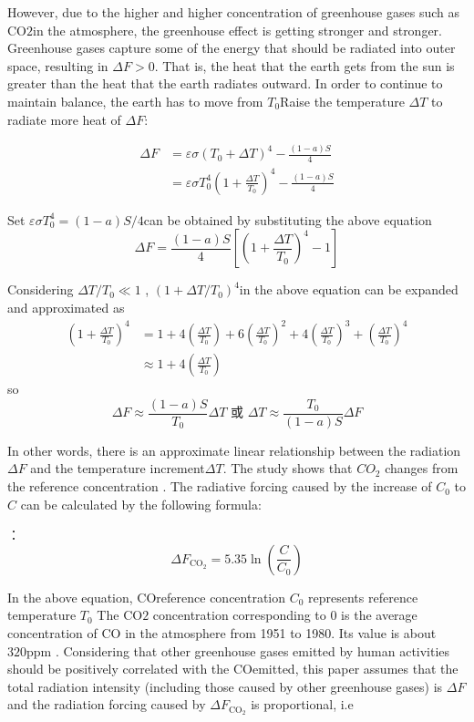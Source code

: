 \documentclass{apmcmthesis}
\begin{document}
However, due to the higher and higher concentration of greenhouse gases such as$\mathrm{CO} 2$in the atmosphere, the greenhouse effect is getting stronger and stronger. Greenhouse gases capture some of the energy that should be radiated into outer space, resulting in $\Delta F>0$. That is, the heat that the earth gets from the sun is greater than the heat that the earth radiates outward. In order to continue to maintain balance, the earth has to move from $T_ 0 $Raise the temperature $\Delta T$ to radiate more heat of $\Delta F$:

$$
\begin{aligned}
\Delta F &=\varepsilon \sigma\left(T_0+\Delta T\right)^4-\frac{(1-a) S}{4} \\
&=\varepsilon \sigma T_0^4\left(1+\frac{\Delta T}{T_0}\right)^4-\frac{(1-a) S}{4}
\end{aligned}
$$

Set $\varepsilon \sigma T_0^4=(1-a) S / 4$can be obtained by substituting the above equation
$$
\Delta F=\frac{(1-a) S}{4}\left[\left(1+\frac{\Delta T}{T_0}\right)^4-1\right]
$$

Considering  $\Delta T / T_0 \ll 1$ , $\left(1+\Delta T / T_0\right)^4$in the above equation can be expanded and approximated as
$$
\begin{aligned}
\left(1+\frac{\Delta T}{T_0}\right)^4 &=1+4\left(\frac{\Delta T}{T_0}\right)+6\left(\frac{\Delta T}{T_0}\right)^2+4\left(\frac{\Delta T}{T_0}\right)^3+\left(\frac{\Delta T}{T_0}\right)^4 \\
& \approx 1+4\left(\frac{\Delta T}{T_0}\right)
\end{aligned}
$$
so
$$
\Delta F \approx \frac{(1-a) S}{T_0} \Delta T \text { 或 } \Delta T \approx \frac{T_0}{(1-a) S} \Delta F
$$

In other words, there is an approximate linear relationship between the radiation  $\Delta F$ and the temperature increment$\Delta T$.
The study shows that $CO_2$ changes from the reference concentration . The radiative forcing caused by the increase of $C_0$ to $C$ can be calculated by the following formula:

：
$$
\Delta F_{\mathrm{CO}_2}=5.35 \ln \left(\frac{C}{C_0}\right)
$$

In the above equation,  $\mathrm{CO}$reference concentration $C_0$ represents reference temperature $T_0$ The   $\mathrm{CO} 2$ concentration corresponding to 0 is the average concentration of $\mathrm{CO}$ in the atmosphere from 1951 to 1980. Its value is about $320 \mathrm{ppm}$ . Considering that other greenhouse gases emitted by human activities should be positively correlated with the $\mathrm{CO}$emitted, this paper assumes that the total radiation intensity (including those caused by other greenhouse gases) is  $\Delta F$and the radiation forcing caused by  $\Delta F_{\mathrm{CO}_2}$ is proportional, i.e
\end{document}
